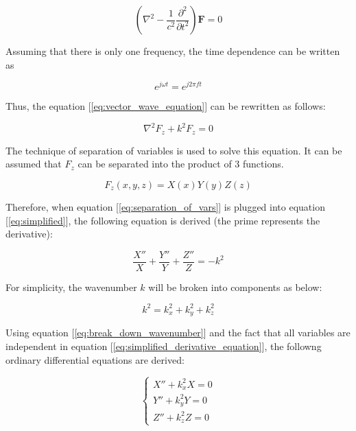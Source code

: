 \documentclass[a4paper,11pt]{jsarticle}
\begin{document}
\begin{equation} \label{eq:vector_wave_equation}
  (\nabla^2 - \frac{1}{c^2}\frac{\partial^2}{\partial t^2})\boldsymbol{F} = 0
\end{equation}

Assuming that there is only one frequency, the time dependence can be written as

\begin{equation}
  e^{j\omega t} = e^{j 2\pi ft}
\end{equation}

Thus, the equation [\ref{eq:vector_wave_equation}] can be rewritten as follows:

\begin{equation} \label{eq:simplified}
  \nabla ^ 2 F_z + k^2 F_z = 0
\end{equation}

The technique of separation of variables is used to solve this equation.
It can be assumed that $F_z$ can be separated into the product of 3 functions.

\begin{equation} \label{eq:separation_of_vars}
  F_z(x,y,z) = X(x)Y(y)Z(z)
\end{equation}

Therefore, when equation [\ref{eq:separation_of_vars}] is plugged into equation [\ref{eq:simplified}],
the following equation is derived
(the prime represents the derivative):

\begin{equation} \label{eq:simplified_derivative_equation}
  \frac{X''}{X} + \frac{Y''}{Y} + \frac{Z''}{Z} = -k^2
\end{equation}

For simplicity, the wavenumber $k$ will be broken into components as below:

\begin{equation} \label{eq:break_down_wavenumber}
  k^2 = k_x^2 + k_y^2 + k_z^2
\end{equation}

Using equation [\ref{eq:break_down_wavenumber}] and the fact that all variables are
independent in equation [\ref{eq:simplified_derivative_equation}],
the followng ordinary differential equations are derived:

\begin{equation} \label{eq:three_ordinary}
  \left\{
  \begin{alignedat}{3}
    X'' + k_x^2 X = 0 \\
    Y'' + k_y^2 Y = 0 \\
    Z'' + k_z^2 Z = 0
  \end{alignedat}
  \right.
\end{equation}
\end{document}
